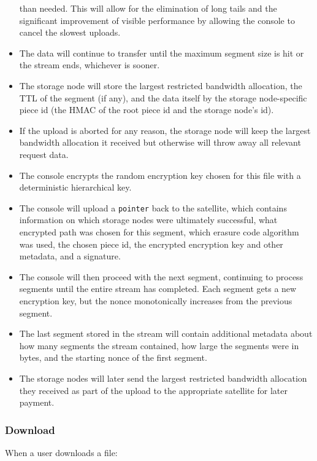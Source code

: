 \documentclass[a4paper,10pt]{article} \usepackage[utf8]{inputenc}
\newcommand{\x}[1]{{\tt #1}} \newcommand{\code}[1]{{\tt #1}}
\begin{document}
\begin{itemize}
  than needed. This will allow for the elimination of long tails and the
  significant improvement of visible performance by allowing the console to
  cancel the slowest uploads.
\item The data will continue to transfer until the maximum segment size is hit
  or the stream ends, whichever is sooner.
\item The storage node will store the largest restricted bandwidth allocation, 
the
  TTL of the segment (if any), and the data itself by the storage node-specific 
  piece
  id (the HMAC of the root piece id and the storage node's id).
\item If the upload is aborted for any reason, the storage node will keep the
  largest bandwidth allocation it received but otherwise will throw away all
  relevant request data.
\item The console encrypts the random encryption key chosen for this file
  with a deterministic hierarchical key.
\item The console will upload a \x{pointer} back to the satellite, which
  contains information on which storage nodes were
  ultimately successful, what encrypted path was chosen for this segment, which
  erasure code algorithm was used, the chosen piece id, the
  encrypted encryption key and other metadata, and a signature.
\item The console will then proceed with the next segment, continuing to
  process segments until the entire stream has completed. Each segment gets
  a new encryption key, but the nonce monotonically increases from the previous
  segment.
\item The last segment stored in the stream will contain additional metadata
  about how many segments the stream contained, how large the segments were
  in bytes, and the starting nonce of the first segment.
\item The storage nodes will later send the largest restricted
  bandwidth allocation they received as part of the upload to the appropriate
  satellite for later payment.
\end{itemize}

\subsubsection{Download}

When a user downloads a file:
\end{document}

